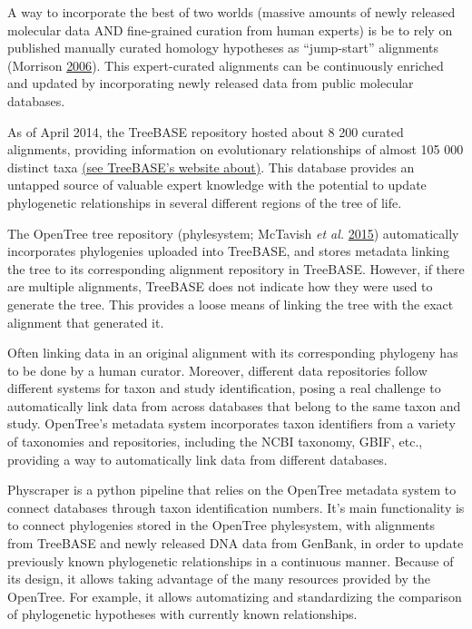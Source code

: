 \documentclass[]{article}
\begin{document}
A way to incorporate the best of two worlds (massive amounts of newly released molecular data AND fine-grained curation from human experts) is be to rely on published manually curated homology hypotheses as ``jump-start'' alignments (Morrison \protect\hyperlink{ref-morrison2006multiple}{2006}). This expert-curated alignments can be continuously enriched and updated by incorporating newly released data from public molecular databases.

As of April 2014, the TreeBASE repository hosted about 8 200 curated alignments, providing information on evolutionary relationships of almost 105 000 distinct taxa \href{https://www.treebase.org/treebase-web/home.html\#:~:text=TreeBASE\%20is\%20produced\%20and\%20governed,mapped\%20to\%20104\%2C593\%20distinct\%20taxa.}{(see TreeBASE's website about)}.
This database provides an untapped source of valuable expert knowledge with the potential to update phylogenetic relationships in several different regions of the tree of life.

The OpenTree tree repository (phylesystem; McTavish \emph{et al.} \protect\hyperlink{ref-mctavish2015phylesystem}{2015}) automatically incorporates phylogenies uploaded into TreeBASE, and stores metadata linking the tree to its corresponding alignment repository in TreeBASE. However, if there are multiple alignments, TreeBASE does not indicate how they were used to generate the tree. This provides a loose means of linking the tree with the exact alignment that generated it.

Often linking data in an original alignment with its corresponding phylogeny has to be done by a human curator.
Moreover, different data repositories follow different systems for taxon and study identification, posing a real challenge to automatically link data from across databases that belong to the same taxon and study.
OpenTree's metadata system incorporates taxon identifiers from a variety of taxonomies and repositories, including the NCBI taxonomy, GBIF, etc., providing a way to automatically link data from different databases.

Physcraper is a python pipeline that relies on the OpenTree metadata system to connect databases through taxon identification numbers.
It's main functionality is to connect phylogenies stored in the OpenTree phylesystem, with alignments from TreeBASE and newly released DNA data from GenBank, in order to update previously known phylogenetic relationships in a continuous manner.
Because of its design, it allows taking advantage of the many resources provided by the OpenTree.
For example, it allows automatizing and standardizing the comparison of phylogenetic hypotheses with currently known relationships.
\end{document}
